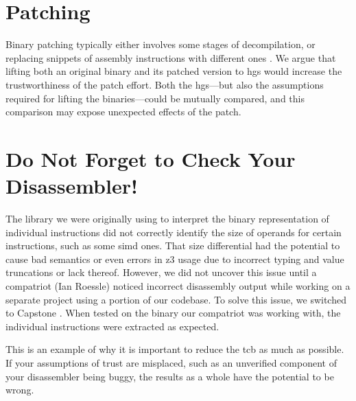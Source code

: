 \section{Patching}
Binary patching typically either involves some stages of decompilation, or replacing snippets of assembly instructions with different ones \autocite{duck2020binary}.
We argue that lifting both an original binary and its patched version to \acp{hg} would increase the trustworthiness of the patch effort.
Both the \acp{hg}---but also the assumptions required for lifting the binaries---could be mutually compared, and this comparison may expose unexpected effects of the patch.

\section{Do Not Forget to Check Your Disassembler!}
The library we were originally using to interpret the binary representation of individual instructions did not correctly identify the size of operands for certain instructions, such as some \ac{simd} ones.
That size differential had the potential to cause bad semantics or even errors in \gls{z3} usage due to incorrect typing and value truncations or lack thereof.
However, we did not uncover this issue until a compatriot (Ian Roessle) noticed incorrect disassembly output while working on a separate project using a portion of our codebase.
To solve this issue, we switched to Capstone \autocite{capstone}.
When tested on the binary our compatriot was working with, the individual instructions were extracted as expected.

This is an example of why it is important to reduce the \ac{tcb} as much as possible.
If your assumptions of trust are misplaced, such as an unverified component of your disassembler being buggy, the results as a whole have the potential to be wrong.
